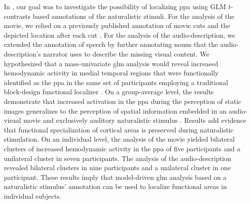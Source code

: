 In \citet{haeusler2022processing}, our goal was to investigate the possibility
of localizing \ac{ppa} using GLM $t$-contrasts based annotations of the
naturalistic stimuli.
For the analysis of the movie, we relied on a previously published annotation of
movie cuts and the depicted location after each cut \citep{haeusler2016cutanno}.
For the analysis of the audio-description, we extended the annotation of speech
by further annotating nouns that the audio-description's narrator uses to
describe the missing visual content.
We hypothesized that a mass-univariate \ac{glm} analysis would reveal increased
hemodynamic activity in medial temporal regions that were functionally
identified as the \ac{ppa} in the same set of participants employing a
traditional block-design functional localizer \citep{sengupta2016extension}.
On a group-average level, the results demonstrate that increased activation in
the \ac{ppa} during the perception of static images generalizes to the
perception of spatial information embedded in an audio-visual movie and
exclusively auditory naturalistic stimulus \citep{haeusler2022processing}.
Results add evidence \citep[cf.][]{bartels2004mapping} that functional
specialization of cortical areas is preserved during naturalistic stimulation.
On an individual level, the analysis of the movie yielded bilateral clusters of
increased hemodynamic activity in the \ac{ppa} of five participants and a
unilateral cluster in seven participants.
%
The analysis of the audio-description revealed bilateral clusters in nine
participants and a unilateral cluster in one participant.
%
These results imply that model-driven \ac{glm} analysis based on a naturalistic
stimulus' annotation can be used to localize functional areas in individual
subjects.

